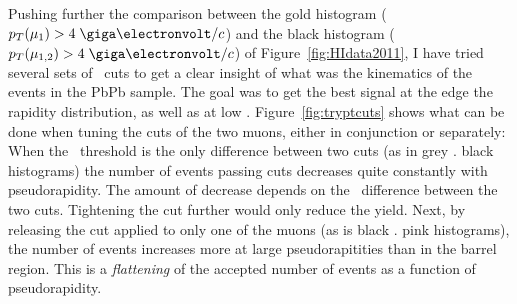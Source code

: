 Pushing further the comparison between the gold histogram
($\pt(\mu_{1}) > 4 \; \GeVc$) and the black histogram ($\pt(\mu_{1,2}) > 4 \; \GeVc$) of
Figure~\ref{fig:HIdata2011}, I have tried several sets of \pt\ cuts
to get a clear insight of what was the kinematics of the events in
the PbPb sample. The goal was to get the best signal at the edge the
rapidity distribution, as well as at low \pt. Figure~\ref{fig:tryptcuts} shows what can be done when tuning the \pt
cuts of the two muons, either in conjunction or separately: When the
\pt\ threshold is the only difference between two cuts (as in grey
\vs. black histograms) the number of events passing cuts decreases quite
constantly with pseudorapidity. The amount of decrease depends on the \pt\ difference between the
two cuts. Tightening the cut further would only reduce the
yield. Next, by releasing the cut applied to only one of the muons (as
is black \vs. pink histograms), the number of events increases more at
large pseudorapitities than in the barrel region. This is a
\textit{flattening} of the accepted number of events as a function of
pseudorapidity. 
\vspace{0.5em}
 \begin{center}
 \end{center}

